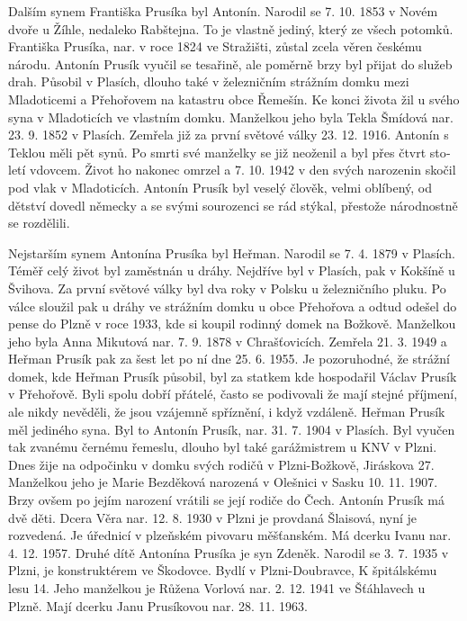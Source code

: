 \documentclass[../dejiny-rodu-prusiku.tex]{subfiles}
\begin{document}
Dalším synem Františka Prusíka byl Antonín. Narodil se 7. 10. 1853 v Novém dvoře u Žíhle, nedaleko Rabštejna. To je vlastně jediný, který ze všech potomků. Františka Prusíka, nar. v roce 1824 ve Stražišti, zůstal zcela věren českému národu. Antonín Prusík vyučil se tesaři­ně, ale poměrně brzy byl přijat do služeb drah. Působil v Plasích, dlouho také v železničním strážním domku mezi Mladoticemi a Přehořovem na katastru obce Řemešín. Ke konci života žil u svého syna v Mladoticích ve vlastním domku. Manželkou jeho byla Tekla Šmídová nar. 23. 9. 1852 v Plasích. Zemřela již za první světové války 23. 12. 1916. Antonín s Teklou měli pět synů. Po smrti své manželky se již neoženil a byl přes čtvrt sto­letí vdovcem. Život ho nakonec omrzel a 7. 10. 1942 v den svých narozenin skočil pod vlak v Mladoticích. Antonín Prusík byl veselý člověk, velmi oblíbený, od dětství dovedl německy a se svými sourozenci se rád stýkal, přestože národnostně se rozdělili.

Nejstarším synem Antonína Prusíka byl Heřman. Narodil se 7. 4. 1879 v Plasích. Téměř celý život byl zaměstnán u dráhy. Nejdříve byl v Plasích, pak v Kokšíně u Švihova. Za první světové války byl dva roky v Polsku u železnič­ního pluku. Po válce sloužil pak u dráhy ve strážním domku u obce Přehořova a odtud odešel do pense do Plzně v roce 1933, kde si koupil rodinný domek na Božkově. Manželkou jeho byla Anna Mikutová nar. 7. 9. 1878 v Chrašťovicích. Zemřela 21. 3. 1949 a Heřman Prusík pak za šest let po ní dne 25. 6. 1955. Je pozoruhodné, že strážní domek, kde Heřman Prusík působil, byl za statkem kde hospodařil Václav Prusík v Přehořově. Byli spolu dobří přáte­lé, často se podivovali že mají stejné příjmení, ale nikdy nevěděli, že jsou vzájemně spříznění, i když vzdáleně. Heřman Prusík měl jediného syna. Byl to Antonín Prusík, nar. 31. 7. 1904 v Plasích. Byl vyučen tak zvanému černému ře­meslu, dlouho byl také garážmistrem u KNV v Plzni. Dnes žije na odpočinku v domku svých rodičů v Plzni-Božkově, Jiráskova 27. Manželkou jeho je Marie Bezděková narozená v Olešnici v Sasku 10. 11. 1907. Brzy ovšem po jejím narození vrátili se její rodiče do Čech. Antonín Prusík má dvě děti. Dcera Věra nar. 12. 8. 1930 v Plzni je provdaná
Šlaisová, nyní je rozvedená. Je úřednicí v plzeňském pivovaru měšťanském. Má dcerku Ivanu nar. 4. 12. 1957. Druhé dítě Antonína Prusíka je syn Zdeněk. Narodil se 3. 7. 1935 v Plzni, je konstruktérem ve Škodovce. Bydlí v Plzni-Doubravce, K špitálskému lesu 14. Jeho man­želkou  je Růžena Vorlová nar. 2. 12. 1941 ve Šťáhlavech u Plzně. Mají dcerku Janu Prusíkovou nar. 28. 11. 1963.
\end{document}
